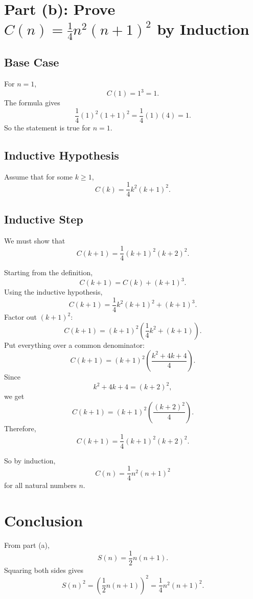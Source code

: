\documentclass[12pt]{article}
\begin{document}
\section*{Part (b): Prove \(C(n)=\frac{1}{4}n^2(n+1)^2\) by Induction}

\subsection*{Base Case}

For \(n=1\),
\[
C(1)=1^3=1.
\]
The formula gives
\[
\frac{1}{4}(1)^2(1+1)^2=\frac{1}{4}(1)(4)=1.
\]
So the statement is true for \(n=1\).

\vspace{3cm}

\subsection*{Inductive Hypothesis}

Assume that for some \(k\geq 1\),
\[
C(k)=\frac{1}{4}k^2(k+1)^2.
\]

\vspace{3cm}

\subsection*{Inductive Step}

We must show that
\[
C(k+1)=\frac{1}{4}(k+1)^2(k+2)^2.
\]

Starting from the definition,
\[
C(k+1)=C(k)+(k+1)^3.
\]
Using the inductive hypothesis,
\[
C(k+1)=\frac{1}{4}k^2(k+1)^2+(k+1)^3.
\]
Factor out \((k+1)^2\):
\[
C(k+1)=(k+1)^2\left(\frac{1}{4}k^2+(k+1)\right).
\]
Put everything over a common denominator:
\[
C(k+1)=(k+1)^2\left(\frac{k^2+4k+4}{4}\right).
\]
Since
\[
k^2+4k+4=(k+2)^2,
\]
we get
\[
C(k+1)=(k+1)^2\left(\frac{(k+2)^2}{4}\right).
\]
Therefore,
\[
C(k+1)=\frac{1}{4}(k+1)^2(k+2)^2.
\]

So by induction,
\[
C(n)=\frac{1}{4}n^2(n+1)^2
\]
for all natural numbers \(n\).

\vspace{5cm}

\newpage

\section*{Conclusion}

From part (a),
\[
S(n)=\frac{1}{2}n(n+1).
\]
Squaring both sides gives
\[
S(n)^2=\left(\frac{1}{2}n(n+1)\right)^2
=\frac{1}{4}n^2(n+1)^2.
\]
\end{document}
